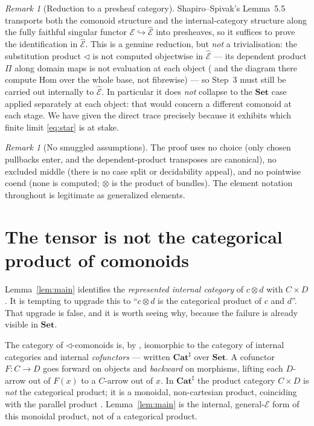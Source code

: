 \documentclass[11pt]{amsart}
\theoremstyle{plain}
\theoremstyle{definition}
\theoremstyle{remark}
\newtheorem{remark}[theorem]{Remark}
\newcommand{\Set}{\mathbf{Set}}
\newcommand{\Cat}{\mathbf{Cat}}
\newcommand{\Ee}{\mathcal{E}}
\newcommand{\sub}{\triangleleft}      %
\begin{document}
\begin{remark}[Reduction to a presheaf category]
Shapiro--Spivak's Lemma~5.5 \cite{ShapiroSpivak2023} transports both the comonoid structure and the
internal-category structure along the fully faithful singular functor
$\Ee\hookrightarrow\widehat{\Ee}$ into presheaves, so it suffices to prove the identification in
$\widehat{\Ee}$. This is a genuine reduction, but \emph{not} a trivialisation: the substitution
product $\sub$ is not computed objectwise in $\widehat{\Ee}$ --- its dependent product $\Pi$ along
domain maps is not evaluation at each object (\cite[Ex.~3.21]{ShapiroSpivak2023} and the diagram there
compute $\mathrm{Hom}$ over the whole base, not fibrewise) --- so Step~3 must still be carried out
internally to $\widehat{\Ee}$. In particular it does \emph{not} collapse to the $\Set$ case
\cite[Prop.~8.79]{NiuSpivak2023} applied separately at each object: that would concern a different
comonoid at each stage. We have given the direct trace precisely because it exhibits which finite
limit \eqref{eq:star} is at stake.
\end{remark}

\begin{remark}[No smuggled assumptions]\label{rem:honest}
The proof uses no choice (only chosen pullbacks enter, and the dependent-product transposes are
canonical), no excluded middle (there is no case split or decidability appeal), and no pointwise
coend (none is computed; $\otimes$ is the product of bundles). The element notation throughout is
legitimate as generalized elements.
\end{remark}

\section{The tensor is not the categorical product of comonoids}\label{sec:notproduct}

Lemma~\ref{lem:main} identifies the \emph{represented internal category} of $c\otimes d$ with
$C\times D$. It is tempting to upgrade this to ``$c\otimes d$ is the categorical product of $c$ and
$d$''. That upgrade is false, and it is worth seeing why, because the failure is already visible in
$\Set$.

The category of $\sub$-comonoids is, by \cite[Cor.~5.12, Def.~5.11]{ShapiroSpivak2023}, isomorphic to
the category of internal categories and internal \emph{cofunctors} --- written $\Cat^{\sharp}$ over
$\Set$. A cofunctor $F:C\to D$ goes forward on objects and \emph{backward} on morphisms, lifting
each $D$-arrow out of $F(x)$ to a $C$-arrow out of $x$. In $\Cat^{\sharp}$ the product category
$C\times D$ is \emph{not} the categorical product; it is a monoidal, non-cartesian product,
coinciding with the parallel product \cite[\S8.2.4]{NiuSpivak2023}. Lemma~\ref{lem:main} is the
internal, general-$\Ee$ form of this monoidal product, not of a categorical product.
\end{document}
